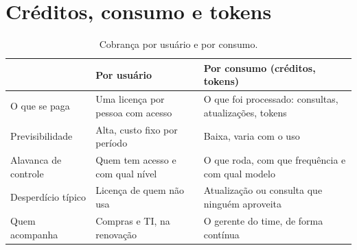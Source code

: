 
\section{Créditos, consumo e tokens}
\label{sec:modelo-consumo}



\begin{table}[htbp]
  \centering
  \caption{Cobrança por usuário e por consumo.}
  \label{tab:usuario-consumo}
  \small
  \begin{tabularx}{\textwidth}{@{}>{\raggedright\arraybackslash}p{}
      >{\raggedright\arraybackslash}X>{\raggedright\arraybackslash}X@{}}
    \toprule
    & Por usuário & Por consumo (créditos, tokens) \\
    \midrule
    O que se paga & Uma licença por pessoa com acesso & O que foi processado: consultas, atualizações, tokens \\
    \addlinespace
    Previsibilidade & Alta, custo fixo por período & Baixa, varia com o uso \\
    \addlinespace
    Alavanca de controle & Quem tem acesso e com qual nível & O que roda, com que frequência e com qual modelo \\
    \addlinespace
    Desperdício típico & Licença de quem não usa & Atualização ou consulta que ninguém aproveita \\
    \addlinespace
    Quem acompanha & Compras e TI, na renovação & O gerente do time, de forma contínua \\
    \bottomrule
  \end{tabularx}
\end{table}

